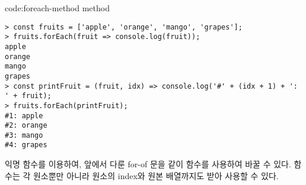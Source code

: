\begin{code}{code:foreach-method}{ method}
\begin{verbatim}
> const fruits = ['apple', 'orange', 'mango', 'grapes'];
> fruits.forEach(fruit => console.log(fruit));
apple
orange
mango
grapes
> const printFruit = (fruit, idx) => console.log('#' + (idx + 1) + ': ' + fruit);
> fruits.forEach(printFruit);
#1: apple
#2: orange
#3: mango
#4: grapes
\end{verbatim}
\end{code}

익명 함수를 이용하여, 앞에서 다룬 for-of 문을 \와 같이  함수를 사용하여 바꿀 수 있다.  함수는 각 원소뿐만 아니라 원소의 index와 원본 배열까지도 받아 사용할 수 있다.
